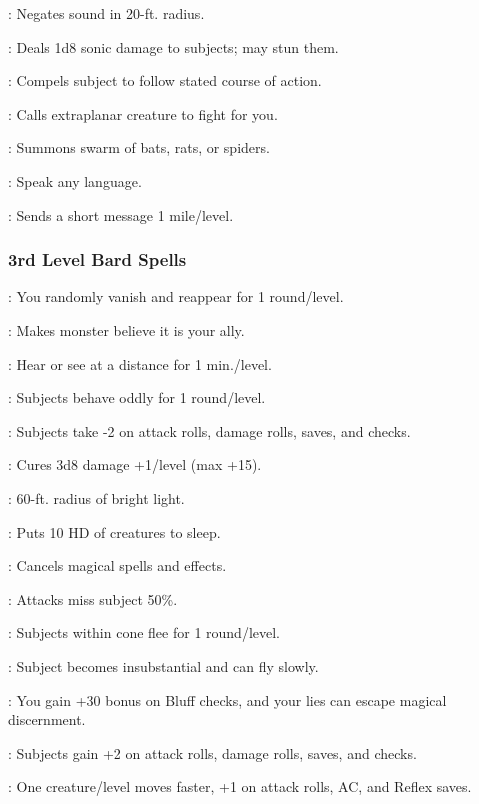 : Negates sound in 20-ft. radius.

: Deals 1d8 sonic damage to subjects; may stun them.

: Compels subject to follow stated course of action.

: Calls extraplanar creature to fight for you.

: Summons swarm of bats, rats, or spiders.

: Speak any language.

: Sends a short message 1 mile/level.

\subsubsection{3rd Level Bard Spells}

: You randomly vanish and reappear for 1 round/level.

: Makes monster believe it is your ally.

: Hear or see at a distance for 1 min./level.

: Subjects behave oddly for 1 round/level.

: Subjects take -2 on attack rolls, damage rolls, saves, and checks.

: Cures 3d8 damage +1/level (max +15).

: 60-ft. radius of bright light.

: Puts 10 HD of creatures to sleep.

: Cancels magical spells and effects.

: Attacks miss subject 50\%.

: Subjects within cone flee for 1 round/level.

: Subject becomes insubstantial and can fly slowly.

: You gain +30 bonus on Bluff checks, and your lies can escape magical discernment.

: Subjects gain +2 on attack rolls, damage rolls, saves, and checks.

: One creature/level moves faster, +1 on attack rolls, AC, and Reflex saves.

